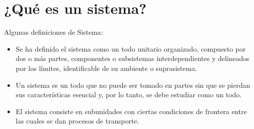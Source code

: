 \section{¿Qué es un sistema?}

Algunas definiciones de Sistema:
\\
\begin{itemize}
    \item Se ha definido el sistema como un todo unitario organizado, compuesto por dos o más partes, componentes o subsistemas interdependientes y delineados por los límites, identificable de su ambiente o suprasistema.

    \item Un sistema es un todo que no puede ser tomado en partes sin que se pierdan sus características esencial y, por lo tanto, se debe estudiar como un todo.

    \item El sistema consiste en subunidades con ciertas condiciones de frontera entre las cuales se dan procesos de transporte.
\end{itemize}